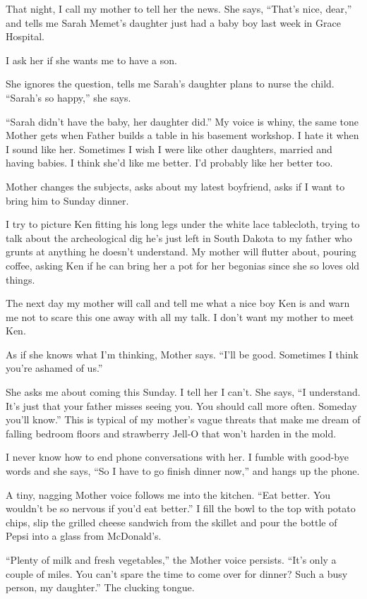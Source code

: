 \documentclass[
]{article}
\begin{document}
That night, I call my mother to tell her the news. She says, ``That's
nice, dear,'' and tells me Sarah Memet's daughter just had a baby boy
last week in Grace Hospital.

I ask her if she wants me to have a son.

She ignores the question, tells me Sarah's daughter plans to nurse the
child. ``Sarah's so happy,'' she says.

``Sarah didn't have the baby, her daughter did.'' My voice is whiny, the
same tone Mother gets when Father builds a table in his basement
workshop. I hate it when I sound like her. Sometimes I wish I were like
other daughters, married and having babies. I think she'd like me
better. I'd probably like her better too.

Mother changes the subjects, asks about my latest boyfriend, asks if I
want to bring him to Sunday dinner.

I try to picture Ken fitting his long legs under the white lace
tablecloth, trying to talk about the archeological dig he's just left in
South Dakota to my father who grunts at anything he doesn't under­stand.
My mother will flutter about, pouring coffee, asking Ken if he can bring
her a pot for her begon­ias since she so loves old things.

The next day my mother will call and tell me what a nice boy Ken is and
warn me not to scare this one away with all my talk. I don't want my
mother to meet Ken.

As if she knows what I'm thinking, Mother says. ``I'll be good.
Sometimes I think you're ashamed of us.''

She asks me about coming this Sunday. I tell her I can't. She says, ``I
understand. It's just that your father misses seeing you. You should
call more often. Someday you'll know.'' This is typical of my mother's
vague threats that make me dream of falling bedroom floors and
strawberry Jell-O that won't harden in the mold.

I never know how to end phone conversations with her. I fumble with
good-bye words and she says, ``So I have to go finish dinner now,'' and
hangs up the phone.

A tiny, nagging Mother voice follows me into the kitchen. ``Eat better.
You wouldn't be so nervous if you'd eat better.'' I fill the bowl to the
top with potato chips, slip the grilled cheese sandwich from the skillet
and pour the bottle of Pepsi into a glass from McDonald's.

``Plenty of milk and fresh vegetables,'' the Mother voice persists.
``It's only a couple of miles. You can't spare the time to come over for
dinner? Such a busy person, my daughter.'' The clucking tongue.
\end{document}
